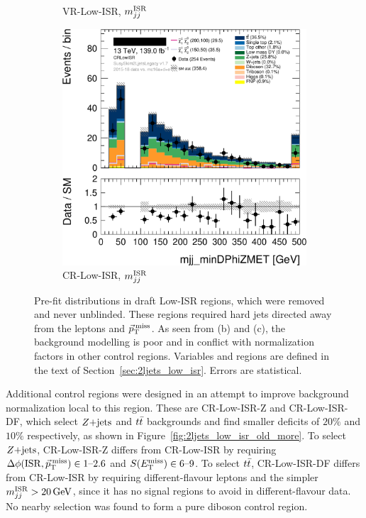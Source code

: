 \begin{figure}[tp]
\begin{subfigure}{0.48\textwidth}
\caption{VR-Low-ISR, $\mwisr$}
\end{subfigure}
\hfill
\begin{subfigure}{0.48\textwidth}
\centering
\includegraphics[width=\textwidth]{figures/2ljets_vrlow_old_crlowisr.png}
\caption{CR-Low-ISR, $\mwisr$}
\end{subfigure}
\caption[
Pre-fit distributions in draft Low-ISR regions, which were removed
]{%
Pre-fit distributions in draft Low-ISR regions, which were removed and never
unblinded.
These regions required hard jets directed away from the leptons and $\ptmiss$.
As seen from (b) and (c), the background modelling is poor and in conflict
with normalization factors in other control regions.
Variables and regions are defined in the text of
Section~\ref{sec:2ljets_low_isr}.
Errors are statistical.
}
\label{fig:2ljets_low_isr_old}
\end{figure}

Additional control regions were designed in an attempt to improve background
normalization local to this region.
These are CR-Low-ISR-Z and CR-Low-ISR-DF, which select $\zjets$ and $\ttbar$
backgrounds and find smaller deficits of $20\%$ and $10\%$ respectively,
as shown in Figure~\ref{fig:2ljets_low_isr_old_more}.
To select $\zjets$, CR-Low-ISR-Z differs from CR-Low-ISR by requiring
$\dphiisrmet \in 1\textrm{--}2.6$ and $\metsig \in 6\textrm{--}9$.
To select $\ttbar$, CR-Low-ISR-DF differs from CR-Low-ISR by requiring
different-flavour leptons and the simpler $\mwisr > 20\,\eV[G]$, since it
has no signal regions to avoid in different-flavour data.
No nearby selection was found to form a pure diboson control region.

